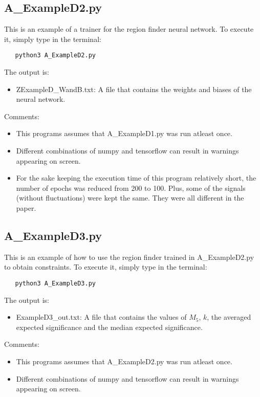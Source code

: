 \documentclass{article}
\begin{document}
\subsection{A\_ExampleD2.py}
This is an example of a trainer for the region finder neural network. To execute it, simply type in the terminal:
\begin{verbatim}
   python3 A_ExampleD2.py
\end{verbatim}
The output is:
\begin{itemize}
  \item ZExampleD\_WandB.txt: A file that contains the weights and biases of the neural network.
\end{itemize}
Comments:
\begin{itemize}
  \item This programs assumes that A\_ExampleD1.py was run atleast once.
  \item Different combinations of numpy and tensorflow can result in warnings appearing on screen.
  \item For the sake keeping the execution time of this program relatively short, the number of epochs was reduced from 200 to 100. Plus, some of the signals (without fluctuations) were kept the same. They were all different in the paper.
\end{itemize}

\subsection{A\_ExampleD3.py}
This is an example of how to use the region finder trained in A\_ExampleD2.py to obtain constraints. To execute it, simply type in the terminal:
\begin{verbatim}
   python3 A_ExampleD3.py
\end{verbatim}
The output is:
\begin{itemize}
  \item ExampleD3\_out.txt: A file that contains the values of $M_5$, $k$, the averaged expected significance and the median expected significance.
\end{itemize}
Comments:
\begin{itemize}
  \item This programs assumes that A\_ExampleD2.py was run atleast once.
  \item Different combinations of numpy and tensorflow can result in warnings appearing on screen.
\end{itemize}

\pagebreak
\end{document}

